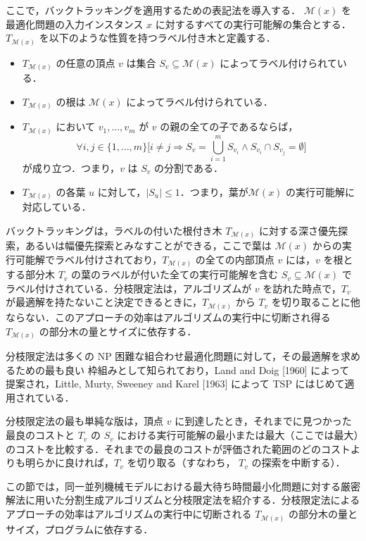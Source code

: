 \documentclass[12pt]{optlab-bachelor}
\begin{document}
ここで，バックトラッキングを適用するための表記法を導入する．
$\mathcal{M}(x)$ を最適化問題の入力インスタンス $x$ に対するすべての実行可能解の集合とする．$T_{\mathcal{M}(x)}$ を以下のような性質を持つラベル付き木と定義する．
\begin{itemize}
  \item $T_{\mathcal{M}(x)}$ の任意の頂点 $v$ は集合 $S_v \subseteq \mathcal{M}(x)$ によってラベル付けられている．
  \item $T_{\mathcal{M}(x)}$ の根は $\mathcal{M}(x)$ によってラベル付けられている．
  \item $T_{\mathcal{M}(x)}$ において $v_1,\ldots,v_m$ が $v$ の親の全ての子であるならば，$$\forall i,j \in \{1,\ldots,m\}\bigg[i \neq j \Rightarrow S_v = \bigcup_{i = 1}^{m}S_{v_i} \land S_{v_i} \cap S_{v_j} = \emptyset \bigg]$$ が成り立つ．つまり，$v$ は $S_v$ の分割である．
  \item $T_{\mathcal{M}(x)}$ の各葉 $u$ に対して，$|S_u| \le 1$．つまり，葉が$\mathcal{M}(x)$ の実行可能解に対応している．
\end{itemize}

バックトラッキングは，ラベルの付いた根付き木 $T_{\mathcal{M}(x)}$ に対する深さ優先探索，あるいは幅優先探索とみなすことができる，ここで葉は $\mathcal{M}(x)$ からの実行可能解でラベル付けされており，$T_{\mathcal{M}(x)}$ の全ての内部頂点 $v$ には，$v$ を根とする部分木 $T_v$ の葉のラベルが付いた全ての実行可能解を含む $S_v \subseteq \mathcal{M}(x)$ でラベル付けされている．分枝限定法は，アルゴリズムが $v$ を訪れた時点で，$T_v$ が最適解を持たないこと決定できるときに，$T_{\mathcal{M}(x)}$ から $T_v$ を切り取ることに他ならない．このアプローチの効率はアルゴリズムの実行中に切断され得る $T_{\mathcal{M}(x)}$ の部分木の量とサイズに依存する．

分枝限定法は多くの NP 困難な組合わせ最適化問題に対して，その最適解を求めるための最も良い
枠組みとして知られており，Land and Doig [1960] \cite{BandB} によって
提案され，Little, Murty, Sweeney and Karel [1963] \cite{BandB2}
によって TSP にはじめて適用されている．

分枝限定法の最も単純な版は，頂点 $v$ に到達したとき，それまでに見つかった最良のコストと $T_v$
の $S_v$ における実行可能解の最小または最大（ここでは最大）のコストを比較する．それまでの最良のコストが評価された範囲のどのコストよりも明らかに良ければ，$T_v$ を切り取る（すなわち， $T_v$ の探索を中断する）．


この節では，同一並列機械モデルにおける最大待ち時間最小化問題に対する厳密解法に用いた分割生成アルゴリズムと分枝限定法を紹介する．分枝限定法によるアプローチの効率はアルゴリズムの実行中に切断される $T_{\mathcal{M}(x)}$ の部分木の量とサイズ，プログラムに依存する．%
\end{document}
